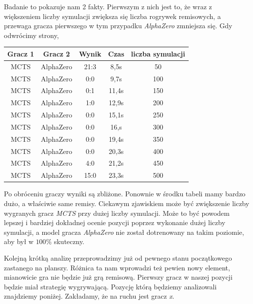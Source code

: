    Badanie to pokazuje nam 2 fakty. Pierwszym z nich jest to, że wraz z większeniem liczby symulacji 
    zwiększa się liczba rogrywek remisowych, a przewaga gracza pierwszego w tym przypadku \textit{AlphaZero}
    zmniejsza się. Gdy odwrócimy strony, 
    \begin{longtable}{|c|c|c|c|c|}
      \hline
      \textbf{Gracz 1} & \textbf{Gracz 2} & \textbf{Wynik} & \textbf{Czas} & \textbf{liczba symulacji} \\ \hline
      MCTS & AlphaZero & 21:3 & 8,5s & 50 \\ \hline
      MCTS & AlphaZero & 0:0 & 9,7s & 100 \\ \hline
      MCTS & AlphaZero & 0:1 & 11,4s & 150 \\ \hline
      MCTS & AlphaZero & 1:0 & 12,9s & 200 \\ \hline
      MCTS & AlphaZero & 0:0 & 15,1s & 250 \\ \hline
      MCTS & AlphaZero & 0:0 & 16,s & 300 \\ \hline
      MCTS & AlphaZero & 0:0 & 19,4s & 350 \\ \hline
      MCTS & AlphaZero & 0:0 & 20,3s & 400 \\ \hline
      MCTS & AlphaZero & 4:0 & 21,2s & 450 \\ \hline
      MCTS & AlphaZero & 15:0 & 23,3s & 500 \\ \hline
      \end{longtable}
    Po obróceniu graczy wyniki są zbliżone. Ponownie w środku tabeli mamy 
    bardzo dużo, a właściwie same remisy. Ciekawym zjawiskiem może być 
    zwiększenie liczby wygranych gracz \textit{MCTS} przy dużej liczby symulacji.
    Może to być powodem lepszej i bardziej dokładnej ocenie pozycji 
    poprzez wykonanie dużej liczby symulacji, a model gracza \textit{AlphaZero}
    nie został dotrenowany na takim poziomie, aby był w $100\%$ skuteczny. 
    
    Kolejną krótką analizę przeprowadzimy już od pewnego stanu początkowego 
    zastanego na planszy. Różnica ta nam wprowadzi też pewien nowy element, 
    mianowicie gra nie będzie już grą remisową. Pierwszy gracz w naszej pozycji 
    będzie miał strategię wygrywającą.
    Pozycję którą będziemy analizowali znajdziemy poniżej. Zakładamy, że na ruchu 
    jest gracz \textit{x}.

    \begin{center}
      \end{center}

